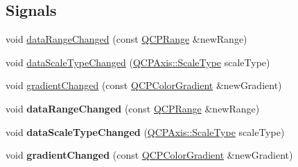 \subsection*{Signals}
\begin{DoxyCompactItemize}
\item 
void \hyperlink{class_q_c_p_color_map_a83ae5be3903da493f732e1a5c14fd807}{data\+Range\+Changed} (const \hyperlink{class_q_c_p_range}{Q\+C\+P\+Range} \&new\+Range)
\item 
void \hyperlink{class_q_c_p_color_map_a978d5d5c9f68cffef8c902b855c04490}{data\+Scale\+Type\+Changed} (\hyperlink{class_q_c_p_axis_a36d8e8658dbaa179bf2aeb973db2d6f0}{Q\+C\+P\+Axis\+::\+Scale\+Type} scale\+Type)
\item 
void \hyperlink{class_q_c_p_color_map_a31a12726736b1ac274e7b1d8dfb67468}{gradient\+Changed} (const \hyperlink{class_q_c_p_color_gradient}{Q\+C\+P\+Color\+Gradient} \&new\+Gradient)
\item 
void {\bfseries data\+Range\+Changed} (const \hyperlink{class_q_c_p_range}{Q\+C\+P\+Range} \&new\+Range)\hypertarget{class_q_c_p_color_map_a83ae5be3903da493f732e1a5c14fd807}{}\label{class_q_c_p_color_map_a83ae5be3903da493f732e1a5c14fd807}

\item 
void {\bfseries data\+Scale\+Type\+Changed} (\hyperlink{class_q_c_p_axis_a36d8e8658dbaa179bf2aeb973db2d6f0}{Q\+C\+P\+Axis\+::\+Scale\+Type} scale\+Type)\hypertarget{class_q_c_p_color_map_a978d5d5c9f68cffef8c902b855c04490}{}\label{class_q_c_p_color_map_a978d5d5c9f68cffef8c902b855c04490}

\item 
void {\bfseries gradient\+Changed} (const \hyperlink{class_q_c_p_color_gradient}{Q\+C\+P\+Color\+Gradient} \&new\+Gradient)\hypertarget{class_q_c_p_color_map_a31a12726736b1ac274e7b1d8dfb67468}{}\label{class_q_c_p_color_map_a31a12726736b1ac274e7b1d8dfb67468}

\end{DoxyCompactItemize}
